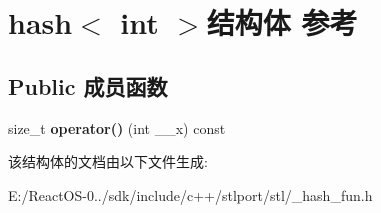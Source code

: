 \hypertarget{structhash_3_01int_01_4}{}\section{hash$<$ int $>$结构体 参考}
\label{structhash_3_01int_01_4}
\subsection*{Public 成员函数}
\begin{DoxyCompactItemize}
\item 
\mbox{\label{structhash_3_01int_01_4_a94f6022355d982e793589f972718244d}} 
size\+\_\+t {\bfseries operator()} (int \+\_\+\+\_\+x) const
\end{DoxyCompactItemize}


该结构体的文档由以下文件生成\+:\begin{DoxyCompactItemize}
\item 
E\+:/\+React\+O\+S-\/0../sdk/include/c++/stlport/stl/\+\_\+hash\+\_\+fun.\+h\end{DoxyCompactItemize}
